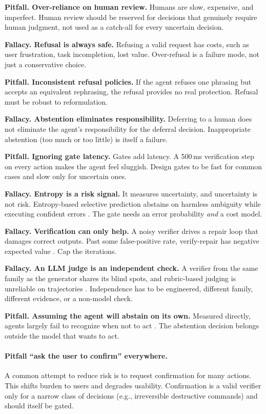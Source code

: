 \textbf{Pitfall. Over-reliance on human review.} Humans are slow, expensive, and imperfect. Human review should be reserved for decisions that genuinely require human judgment, not used as a catch-all for every uncertain decision.

\textbf{Fallacy. Refusal is always safe.} Refusing a valid request has costs, such as user frustration, task incompletion, lost value. Over-refusal is a failure mode, not just a conservative choice.

\textbf{Pitfall. Inconsistent refusal policies.} If the agent refuses one phrasing but accepts an equivalent rephrasing, the refusal provides no real protection. Refusal must be robust to reformulation.

\textbf{Fallacy. Abstention eliminates responsibility.} Deferring to a human does not eliminate the agent's responsibility for the deferral decision. Inappropriate abstention (too much or too little) is itself a failure.

\textbf{Pitfall. Ignoring gate latency.} Gates add latency. A 500\,ms verification
step on every action makes the agent feel sluggish. Design gates to be fast for
common cases and slow only for uncertain ones.

\textbf{Fallacy. Entropy is a risk signal.} It measures uncertainty, and
uncertainty is not risk. Entropy-based selective prediction abstains on harmless
ambiguity while executing confident errors \cite{entropyinsuff2026}. The gate needs
an error probability \emph{and} a cost model.

\textbf{Fallacy. Verification can only help.} A noisy verifier drives a repair loop
that damages correct outputs. Past some false-positive rate, verify-repair has
negative expected value \cite{verifyrepair2026}. Cap the iterations.

\textbf{Fallacy. An LLM judge is an independent check.} A verifier from the same
family as the generator shares its blind spots, and rubric-based judging is
unreliable on trajectories \cite{judgerubric2026}. Independence has to be
engineered, different family, different evidence, or a non-model check.

\textbf{Pitfall. Assuming the agent will abstain on its own.} Measured directly,
agents largely fail to recognize when not to act \cite{agentabstain2026}. The
abstention decision belongs outside the model that wants to act.

\paragraph{Pitfall ``ask the user to confirm'' everywhere.}
A common attempt to reduce risk is to request confirmation for many actions. This shifts burden to users and degrades usability. Confirmation is a valid verifier only for a narrow class of decisions (e.g., irreversible destructive commands) and should itself be gated.

